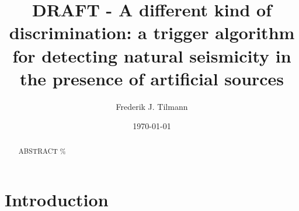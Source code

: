 \documentclass[11pt]{article}
\title{DRAFT -    A different kind of discrimination: a trigger algorithm for detecting natural seismicity in the presence of artificial sources}
\author{Frederik J. Tilmann}
\date{\today}
\providecommand{\DIFaddbegin}{} %
\providecommand{\DIFaddend}{} %
\providecommand{\DIFdelbegin}{} %
\providecommand{\DIFdelend}{} %
\begin{document}
\maketitle

\begin{abstract}
ABSTRACT \DIFaddbegin \% %
\\%
\DIFaddend \end{abstract}

\DIFdelbegin %
\DIFdelend \DIFaddbegin \section{\DIFaddend Introduction}
\end{document}

